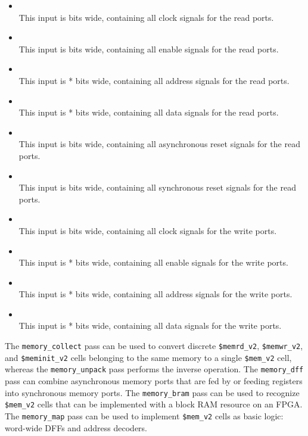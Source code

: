 \begin{itemize}
\item {} \\
This input is  bits wide, containing all clock signals for the read ports.

\item {} \\
This input is  bits wide, containing all enable signals for the read ports.

\item {} \\
This input is * bits wide, containing all address signals for the read ports.

\item {} \\
This input is * bits wide, containing all data signals for the read ports.

\item {} \\
This input is  bits wide, containing all asynchronous reset signals for the read ports.

\item {} \\
This input is  bits wide, containing all synchronous reset signals for the read ports.

\item {} \\
This input is  bits wide, containing all clock signals for the write ports.

\item {} \\
This input is * bits wide, containing all enable signals for the write ports.

\item {} \\
This input is * bits wide, containing all address signals for the write ports.

\item {} \\
This input is * bits wide, containing all data signals for the write ports.
\end{itemize}

The {\tt memory\_collect} pass can be used to convert discrete {\tt \$memrd\_v2}, {\tt \$memwr\_v2}, and {\tt \$meminit\_v2} cells
belonging to the same memory to a single {\tt \$mem\_v2} cell, whereas the {\tt memory\_unpack} pass performs the inverse operation.
The {\tt memory\_dff} pass can combine asynchronous memory ports that are fed by or feeding registers into synchronous memory ports.
The {\tt memory\_bram} pass can be used to recognize {\tt \$mem\_v2} cells that can be implemented with a block RAM resource on an FPGA.
The {\tt memory\_map} pass can be used to implement {\tt \$mem\_v2} cells as basic logic: word-wide DFFs and address decoders.

